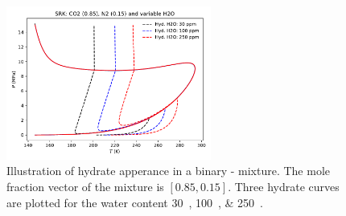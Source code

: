 \documentclass[english]{../thermomemo/thermomemo}
\begin{document}
\begin{figure}[ht]
  \centering
  \includegraphics[width=0.6\textwidth]{hydrate_co2_n2}
  \caption{Illustration of hydrate apperance in a binary
    - mixture. The mole fraction vector of the mixture
    is $\left[0.85,0.15\right]$. Three hydrate curves are plotted for
    the water content \SIlist{30;100;250}{\ppm}.}
  \label{fig:hydrate_co2_n2}
\end{figure}

\clearpage


\end{document}
